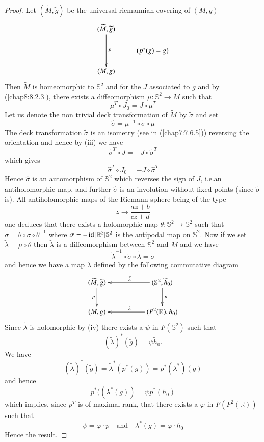 \begin{proof}
Let $(\widetilde{M},\widetilde{g})$ be the universal riemannian
covering of $(M,g)$
\[
\xymatrix@R=.5cm{
(\widetilde{M},\widetilde{g})\ar[dd]^{p} &\\
 & (p^{\ast}(g)=g)\\
(M,g)
}
\]
Then $\widetilde{M}$ is homeomorphic to $\mathbb{S}^{2}$ and for the
$J$ associated to $g$ and by (\ref{chap8:8.2.3}), there exists a
diffeomorphism $\mu:\mathbb{S}^{2}\to M$ such that
$$
\mu^{T}\circ J_{0}=J\circ \mu^{T}
$$
Let us denote the non trivial deck transformation of $\widetilde{M}$
by $\widetilde{\sigma}$ and set
$$
\widehat{\sigma}=\mu^{-1}\circ\widetilde{\sigma}\circ\mu
$$
The deck transformation $\widetilde{\sigma}$ is an isometry (see in
(\ref{chap7:7.6.5})) reversing the orientation and hence by (iii) we have
$$
\widetilde{\sigma}^{T}\circ J=-J\circ \widetilde{\sigma}^{T}
$$
which gives
$$
\widehat{\sigma}^{T}\circ J_{0}=-J\circ\widehat{\sigma}^{T}
$$
Hence $\widehat{\sigma}$ is an automorphism of $\mathbb{S}^{2}$ which
reverses the sign of $J$, i.e.\@ an antiholomorphic map, and further
$\widehat{\sigma}$ is an involution without fixed points (since
$\widetilde{\sigma}$ is). All antiholomorphic maps of the Riemann
sphere being of the type
$$
z\to \dfrac{a\overline{z}+b}{c\overline{z}+d}
$$
one \pageoriginale deduces that there exists a holomorphic map
$\theta:\mathbb{S}^{2}\to \mathbb{S}^{2}$ such that
$\widehat{\sigma}=\theta\circ \sigma\circ \theta^{-1}$ where
$\sigma= -\operatorname{id}|\mathbb{R}^{3}|\mathbb{S}^{2}$ is the antipodal map on
$\mathbb{S}^{2}$. Now if we set $\widetilde{\lambda}=\mu\circ\theta$
then $\widetilde{\lambda}$ is a diffeomorphism between
$\mathbb{S}^{2}$ and $M$ and we have
$$
\widetilde{\lambda}^{-1}\circ\widetilde{\sigma}\circ\widetilde{\lambda}=\sigma
$$
and hence we have a map $\lambda$ defined by the following commutative
diagram
\[
\xymatrix@C=1.8cm{
(\widetilde{M},\widetilde{g})\ar[d]_{p} &
  (\mathbb{S}^{2},\widetilde{h}_{0})\ar[d]^{p}\ar[l]_{\widetilde{\lambda}}\\
(M,g) & (P^{2}(\mathbb{R}),h_{0})\ar[l]_{\lambda}
}
\]
Since $\widetilde{\lambda}$ is holomorphic by (iv) there exists a
$\psi$ in $F(\mathbb{S}^{2})$ such that
$$
(\widetilde{\lambda})^{\ast}(\widetilde{g})=\psi\widetilde{h}_{0}.
$$
We have
$$
(\widetilde{\lambda})^{\ast}(\widetilde{g})=\widetilde{\lambda}^{\ast}(p^{\ast}(g))=p^{\ast}(\lambda^{\ast})(g) 
$$
and hence
$$
p^{\ast}((\lambda^{\ast}(g))=\psi p^{\ast}(h_{0})
$$
which implies, since $p^{T}$ is of maximal rank, that there exists a
$\varphi$ in $F(P^{2}(\mathbb{R}))$ such that
$$
\psi=\varphi\cdot p\quad\text{and}\quad \lambda^{\ast}(g)=\varphi\cdot
h_{0}
$$
Hence the result.
\end{proof}

